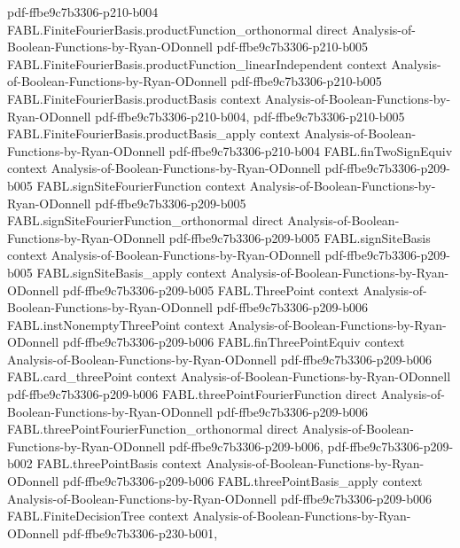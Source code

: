 \begin{theorem}
  {pdf-ffbe9c7b3306-p210-b004}
\proofstep
  {FABL.FiniteFourierBasis.productFunction_orthonormal}
  {direct}
  {Analysis-of-Boolean-Functions-by-Ryan-ODonnell}
  {pdf-ffbe9c7b3306-p210-b005}
\proofstep
  {FABL.FiniteFourierBasis.productFunction_linearIndependent}
  {context}
  {Analysis-of-Boolean-Functions-by-Ryan-ODonnell}
  {pdf-ffbe9c7b3306-p210-b005}
\proofstep
  {FABL.FiniteFourierBasis.productBasis}
  {context}
  {Analysis-of-Boolean-Functions-by-Ryan-ODonnell}
  {pdf-ffbe9c7b3306-p210-b004,
    pdf-ffbe9c7b3306-p210-b005}
\proofstep
  {FABL.FiniteFourierBasis.productBasis_apply}
  {context}
  {Analysis-of-Boolean-Functions-by-Ryan-ODonnell}
  {pdf-ffbe9c7b3306-p210-b004}
\proofstep
  {FABL.finTwoSignEquiv}
  {context}
  {Analysis-of-Boolean-Functions-by-Ryan-ODonnell}
  {pdf-ffbe9c7b3306-p209-b005}
\proofstep
  {FABL.signSiteFourierFunction}
  {context}
  {Analysis-of-Boolean-Functions-by-Ryan-ODonnell}
  {pdf-ffbe9c7b3306-p209-b005}
\proofstep
  {FABL.signSiteFourierFunction_orthonormal}
  {direct}
  {Analysis-of-Boolean-Functions-by-Ryan-ODonnell}
  {pdf-ffbe9c7b3306-p209-b005}
\proofstep
  {FABL.signSiteBasis}
  {context}
  {Analysis-of-Boolean-Functions-by-Ryan-ODonnell}
  {pdf-ffbe9c7b3306-p209-b005}
\proofstep
  {FABL.signSiteBasis_apply}
  {context}
  {Analysis-of-Boolean-Functions-by-Ryan-ODonnell}
  {pdf-ffbe9c7b3306-p209-b005}
\proofstep
  {FABL.ThreePoint}
  {context}
  {Analysis-of-Boolean-Functions-by-Ryan-ODonnell}
  {pdf-ffbe9c7b3306-p209-b006}
\proofstep
  {FABL.instNonemptyThreePoint}
  {context}
  {Analysis-of-Boolean-Functions-by-Ryan-ODonnell}
  {pdf-ffbe9c7b3306-p209-b006}
\proofstep
  {FABL.finThreePointEquiv}
  {context}
  {Analysis-of-Boolean-Functions-by-Ryan-ODonnell}
  {pdf-ffbe9c7b3306-p209-b006}
\proofstep
  {FABL.card_threePoint}
  {context}
  {Analysis-of-Boolean-Functions-by-Ryan-ODonnell}
  {pdf-ffbe9c7b3306-p209-b006}
\proofstep
  {FABL.threePointFourierFunction}
  {direct}
  {Analysis-of-Boolean-Functions-by-Ryan-ODonnell}
  {pdf-ffbe9c7b3306-p209-b006}
\proofstep
  {FABL.threePointFourierFunction_orthonormal}
  {direct}
  {Analysis-of-Boolean-Functions-by-Ryan-ODonnell}
  {pdf-ffbe9c7b3306-p209-b006,
    pdf-ffbe9c7b3306-p209-b002}
\proofstep
  {FABL.threePointBasis}
  {context}
  {Analysis-of-Boolean-Functions-by-Ryan-ODonnell}
  {pdf-ffbe9c7b3306-p209-b006}
\proofstep
  {FABL.threePointBasis_apply}
  {context}
  {Analysis-of-Boolean-Functions-by-Ryan-ODonnell}
  {pdf-ffbe9c7b3306-p209-b006}
\proofstep
  {FABL.FiniteDecisionTree}
  {context}
  {Analysis-of-Boolean-Functions-by-Ryan-ODonnell}
  {pdf-ffbe9c7b3306-p230-b001,
}
\end{theorem}
